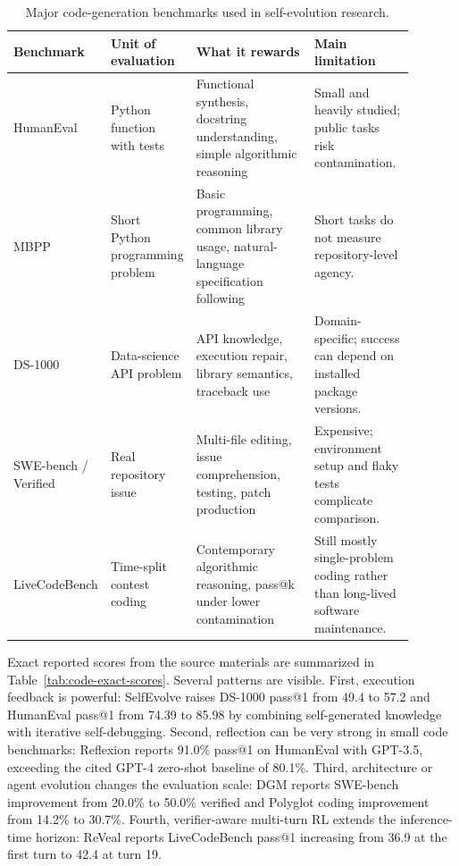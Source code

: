 \begin{table}[t]
\centering
\small
\caption{Major code-generation benchmarks used in self-evolution research.}
\label{tab:code-benchmarks-landscape}
\begin{tabular}{p{0.16\linewidth}p{0.18\linewidth}p{0.30\linewidth}p{0.25\linewidth}}
\toprule
\textbf{Benchmark} & \textbf{Unit of evaluation} & \textbf{What it rewards} & \textbf{Main limitation} \\
\midrule
HumanEval & Python function with tests & Functional synthesis, docstring understanding, simple algorithmic reasoning & Small and heavily studied; public tasks risk contamination. \\
MBPP & Short Python programming problem & Basic programming, common library usage, natural-language specification following & Short tasks do not measure repository-level agency. \\
DS-1000 & Data-science API problem & API knowledge, execution repair, library semantics, traceback use & Domain-specific; success can depend on installed package versions. \\
SWE-bench / Verified & Real repository issue & Multi-file editing, issue comprehension, testing, patch production & Expensive; environment setup and flaky tests complicate comparison. \\
LiveCodeBench & Time-split contest coding & Contemporary algorithmic reasoning, pass@k under lower contamination & Still mostly single-problem coding rather than long-lived software maintenance. \\
\bottomrule
\end{tabular}
\end{table}

Exact reported scores from the source materials are summarized in Table~\ref{tab:code-exact-scores}. Several patterns are visible. First, execution feedback is powerful: SelfEvolve raises DS-1000 pass@1 from 49.4 to 57.2 and HumanEval pass@1 from 74.39 to 85.98 by combining self-generated knowledge with iterative self-debugging. Second, reflection can be very strong in small code benchmarks: Reflexion reports 91.0\% pass@1 on HumanEval with GPT-3.5, exceeding the cited GPT-4 zero-shot baseline of 80.1\%. Third, architecture or agent evolution changes the evaluation scale: DGM reports SWE-bench improvement from 20.0\% to 50.0\% verified and Polyglot coding improvement from 14.2\% to 30.7\%. Fourth, verifier-aware multi-turn RL extends the inference-time horizon: ReVeal reports LiveCodeBench pass@1 increasing from 36.9 at the first turn to 42.4 at turn 19.

